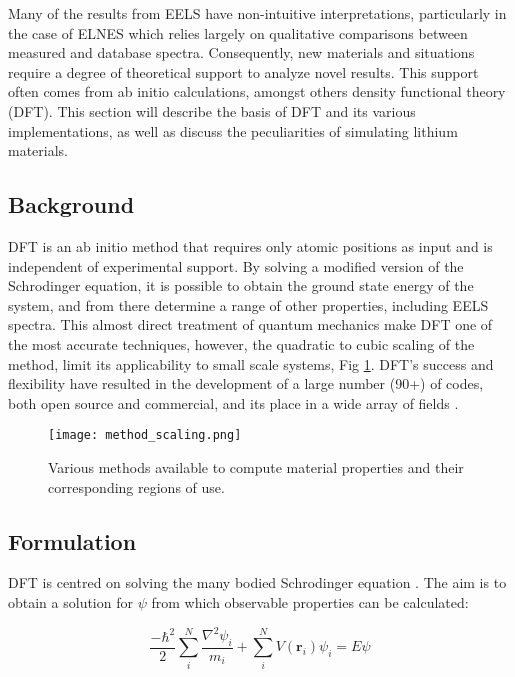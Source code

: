 

 


Many of the results from EELS have non-intuitive interpretations, particularly in the case of ELNES which relies largely on qualitative comparisons between measured and database spectra.  Consequently, new materials and situations require a degree of theoretical support to analyze novel results.  This support often comes from ab initio calculations, amongst others density functional theory (DFT).  This section will describe the basis of DFT and its various implementations, as well as discuss the peculiarities of simulating lithium materials.

\subsection{Background}
DFT is an ab initio method that requires only atomic positions as input and is independent of experimental support.  By solving a modified version of the Schrodinger equation, it is possible to obtain the ground state energy of the system, and from there determine a range of other properties, including EELS spectra. This almost direct treatment of quantum mechanics make DFT one of the most accurate techniques, however, the quadratic to cubic scaling of the method, limit its applicability to small scale systems, Fig \ref{scaling}.  DFT's success and flexibility have resulted in the development of a large number (90+) of codes, both open source and commercial, and its place in a wide array of fields \cite{DFT_codes}.  

\begin{figure}
	\centering
	\texttt{[image: method\_scaling.png]}
	\caption{Various methods available to compute material properties and their corresponding regions of use. }
	\label{scaling}
\end{figure}


\subsection{Formulation}

DFT is centred  on solving the many bodied  Schrodinger equation \cite{sholl_density_2009}.  The aim is to obtain a solution for $\psi$ from which observable properties can be calculated:  

\begin{equation}
	\frac{-\hbar^2}{2} \sum_{i}^{N} \frac{\nabla^2 \psi_i}{m_i} + \sum_{i}^{N} V(\textbf{r}_i) \psi_i = E \psi
\end{equation}

